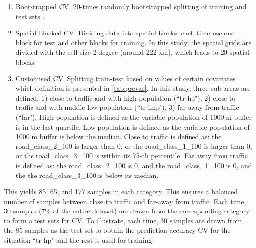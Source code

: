 \documentclass{article}
\begin{document}
\begin{enumerate}
\item Bootstrapped CV. 20-times randomly bootstrapped splitting of training and test sets \citep{luglobal}.  

\item Spatial-blocked CV. Dividing data into spatial blocks, each time use one block for test and other blocks for training. In this study, the spatial grids are divided with the cell size 2 degree (around 222 km), which leads to 20 spatial blocks.
    
\item Customised CV. Splitting train-test based on values of certain covariates which definition is presented in \cref{tab:prevar}. In this study, three sub-areas are defined, 1) close to traffic and with high population (``tr-hp"), 2) close to traffic and with middle low population (``tr-lmp"), 3) far away from traffic (``far"). High population is defined as the variable population of 1000 m buffer is in the last quartile. Low population is defined as the variable population of 1000 m buffer is below the median. Close to traffic is defined as: 
the road\_class\_2\_100 is larger than 0, or the road\_class\_1\_100 is larger than 0, or the road\_class\_3\_100 is within its 75-th percentile.  
Far away from traffic is defined as:
the road\_class\_2\_100 is 0, and the
    road\_class\_1\_100 is 0, and the
    the road\_class\_3\_100 is below its median.  
    
     
\end{enumerate}
This yields 85, 65, and 177 samples in each category. This ensures a balanced number of samples between close to traffic and far-away from traffic. Each time, 30 samples (7\% of the entire dataset) are drawn from the corresponding category to form a test sets for CV. To illustrate, each time, 30 samples are drawn from the 85 samples as the test set to obtain the prediction accuracy CV for the situation ``tr-hp" and the rest is used for training.  
\end{document}
